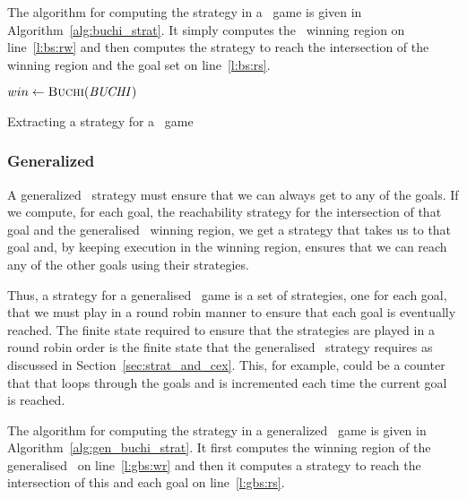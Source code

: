 The algorithm for computing the strategy in a \buchi\ game is given in Algorithm~\ref{alg:buchi_strat}. It simply computes the \buchi\ winning region on line~\ref{l:bs:rw} and then computes the strategy to reach the intersection of the winning region and the goal set on line~\ref{l:bs:rs}.

\begin{algorithm}[t]
\begin{algorithmic}[1]

    \State $win \gets \Call{Buchi}{\buchiobj}$ \label{l:bs:rw}
    \State \Return {} \label{l:bs:rs}
\EndFunction

\end{algorithmic}
\caption{Extracting a strategy for a \buchi\ game}
\label{alg:buchi_strat}
\end{algorithm}

\subsubsection{Generalized \buchi}

A generalized \buchi\ strategy must ensure that we can always get to any of the goals. If we compute, for each goal, the reachability strategy for the intersection of that goal and the generalised \buchi\ winning region, we get a strategy that takes us to that goal and, by keeping execution in the winning region, ensures that we can reach any of the other goals using their strategies. 

Thus, a strategy for a generalised \buchi\ game is a set of strategies, one for each goal, that we must play in a round robin manner to ensure that each goal is eventually reached. The finite state required to ensure that the strategies are played in a round robin order is the finite state that the generalised \buchi\ strategy requires as discussed in Section~\ref{sec:strat_and_cex}. This, for example, could be a counter that that loops through the goals and is incremented each time the current goal is reached.

The algorithm for computing the strategy in a generalized \buchi\ game is given in Algorithm~\ref{alg:gen_buchi_strat}. It first computes the winning region of the generalised \buchi\ on line~\ref{l:gbs:wr} and then it computes a strategy to reach the intersection of this and each goal on line~\ref{l:gbs:rs}.

